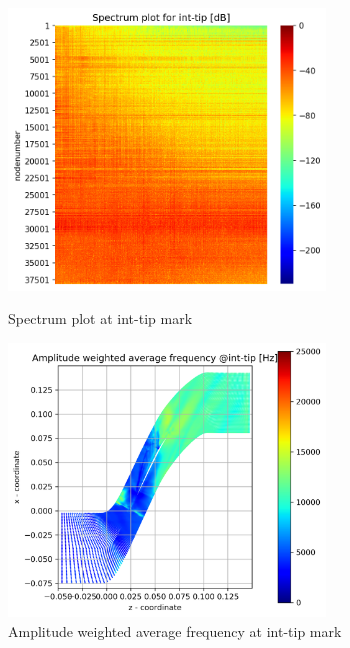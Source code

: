 \begin{figure}[ht]
  \centering
  \includegraphics[width=0.75\textwidth]{Figures/int-tip_spectrum.png}
  \caption{Spectrum plot at int-tip mark} \label{int-tip-spectrum}
  
  \vspace*{\floatsep}%

  \includegraphics[width=0.75\textwidth]{Figures/int-tip-awaf.png}
  \caption{Amplitude weighted average frequency at int-tip mark} \label{int-tip-awaf}
\end{figure}
